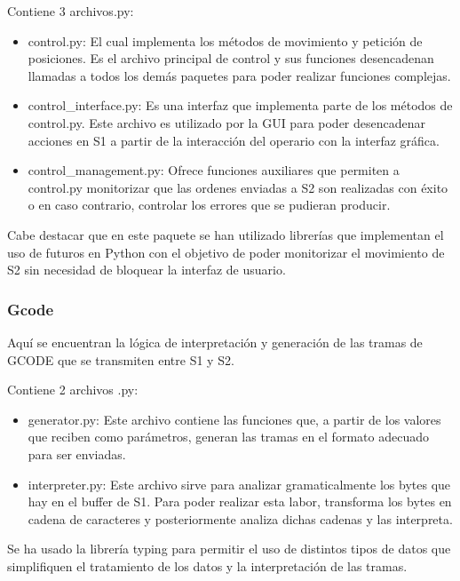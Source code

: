 Contiene 3 archivos.py:

\begin{itemize}
    \item control.py: El cual implementa los métodos de movimiento y petición de posiciones. Es el archivo principal de control y sus funciones desencadenan llamadas a todos los demás paquetes para poder realizar funciones complejas.
    \item control\_interface.py: Es una interfaz que implementa parte de los métodos de control.py. Este archivo es utilizado por la GUI para poder desencadenar acciones en \ac{S1} a partir de la interacción del operario con la interfaz gráfica.
    \item control\_management.py: Ofrece funciones auxiliares que permiten a control.py monitorizar que las ordenes enviadas a \ac{S2} son realizadas con éxito o en caso contrario, controlar los errores que se pudieran producir.
\end{itemize}

Cabe destacar que en este paquete se han utilizado librerías  que implementan el uso de futuros en Python con el objetivo de poder monitorizar el movimiento de \ac{S2} sin necesidad de bloquear la interfaz de usuario.

\subsubsection{Gcode}

Aquí se encuentran la lógica de interpretación y generación de las tramas de GCODE que se transmiten entre \ac{S1} y \ac{S2}.

Contiene 2 archivos .py:

\begin{itemize}
    \item generator.py: Este archivo contiene las funciones que, a partir de los valores que reciben como parámetros, generan las tramas en el formato adecuado para ser enviadas.
    
    \item interpreter.py: Este archivo sirve para analizar gramaticalmente los bytes que hay en el buffer de \ac{S1}.
    Para poder realizar esta labor, transforma los bytes en cadena de caracteres y posteriormente analiza dichas cadenas y las interpreta.
\end{itemize}

Se ha usado la librería typing para permitir el uso de distintos tipos de datos que simplifiquen el tratamiento de los datos y la interpretación de las tramas.

